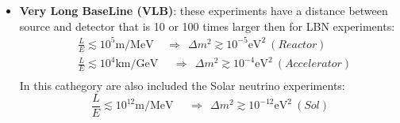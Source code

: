 \documentclass[12pt,a4paper,openright,twoside]{report}
\begin{document}
\begin{itemize}
	\item \textbf{Very Long BaseLine (VLB)}: these experiments have a distance between source and detector that is 10 or 100 times larger then for  LBN experiments:
	\begin{equation}
	\begin{split}
	&\frac{L}{E}\lesssim 10^5 \text{m/MeV} \ \ \ \ \  \Longrightarrow \ \ \Delta m^2 \gtrsim 10^{-5}\text{eV}^2 \ (Reactor)\\ 
	&\frac{L}{E}\lesssim 10^4 \text{km/GeV} \ \ \ \ \ \  \Longrightarrow \ \ \Delta m^2 \gtrsim 10^{-4}\text{eV}^2  \ (Accelerator)\\
	\end{split}
	\end{equation}
	In this cathegory are also included the Solar neutrino experiments:
	\begin{equation}
	\frac{L}{E}\lesssim 10^{12} \text{m/MeV} \ \ \ \ \ \  \Longrightarrow \ \ \Delta m^2 \gtrsim 10^{-12}\text{eV}^2  \ (Sol)
	\end{equation}
	
\end{itemize}
\end{document}
